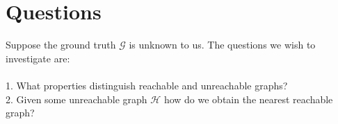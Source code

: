 \documentclass{article}
\theoremstyle{definition}
\begin{document}
\newpage

\section{Questions}

Suppose the ground truth $\mathcal{G}$ is unknown to us. The questions we wish to investigate are:
\\
\\
1. What properties distinguish reachable and unreachable graphs? 
\\
2. Given some unreachable graph $\mathcal{H}$ how do we obtain the nearest reachable graph?




	


\end{document}
